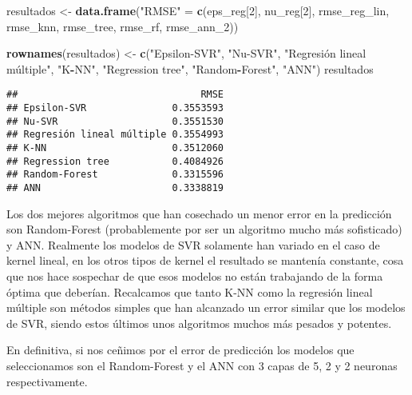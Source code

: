 \documentclass[
]{article}
\newenvironment{Shaded}{\begin{snugshade}}{\end{snugshade}}
\newcommand{\DecValTok}[1]{\textcolor[rgb]{0.00,0.00,0.81}{#1}}
\newcommand{\KeywordTok}[1]{\textcolor[rgb]{0.13,0.29,0.53}{\textbf{#1}}}
\newcommand{\NormalTok}[1]{#1}
\newcommand{\OperatorTok}[1]{\textcolor[rgb]{0.81,0.36,0.00}{\textbf{#1}}}
\newcommand{\StringTok}[1]{\textcolor[rgb]{0.31,0.60,0.02}{#1}}
\begin{document}
\begin{Shaded}
\begin{Highlighting}[]
\NormalTok{resultados <-}\StringTok{ }\KeywordTok{data.frame}\NormalTok{(}\StringTok{"RMSE"}\NormalTok{ =}\StringTok{ }\KeywordTok{c}\NormalTok{(eps_reg[}\DecValTok{2}\NormalTok{], nu_reg[}\DecValTok{2}\NormalTok{], rmse_reg_lin, rmse_knn, rmse_tree, rmse_rf,}
\NormalTok{                                    rmse_ann_}\DecValTok{2}\NormalTok{))}

\KeywordTok{rownames}\NormalTok{(resultados) <-}\StringTok{ }\KeywordTok{c}\NormalTok{(}\StringTok{"Epsilon-SVR"}\NormalTok{, }\StringTok{"Nu-SVR"}\NormalTok{, }\StringTok{"Regresión lineal múltiple", "}\NormalTok{K}\OperatorTok{-}\NormalTok{NN}\StringTok{", "}\NormalTok{Regression tree}\StringTok{",}
\StringTok{                           "}\NormalTok{Random}\OperatorTok{-}\NormalTok{Forest}\StringTok{", "}\NormalTok{ANN}\StringTok{")}
\StringTok{resultados}
\end{Highlighting}
\end{Shaded}

\begin{verbatim}
##                                RMSE
## Epsilon-SVR               0.3553593
## Nu-SVR                    0.3551530
## Regresión lineal múltiple 0.3554993
## K-NN                      0.3512060
## Regression tree           0.4084926
## Random-Forest             0.3315596
## ANN                       0.3338819
\end{verbatim}

Los dos mejores algoritmos que han cosechado un menor error en la
predicción son Random-Forest (probablemente por ser un algoritmo mucho
más sofisticado) y ANN. Realmente los modelos de SVR solamente han
variado en el caso de kernel lineal, en los otros tipos de kernel el
resultado se mantenía constante, cosa que nos hace sospechar de que esos
modelos no están trabajando de la forma óptima que deberían. Recalcamos
que tanto K-NN como la regresión lineal múltiple son métodos simples que
han alcanzado un error similar que los modelos de SVR, siendo estos
últimos unos algoritmos muchos más pesados y potentes.

En definitiva, si nos ceñimos por el error de predicción los modelos que
seleccionamos son el Random-Forest y el ANN con 3 capas de 5, 2 y 2
neuronas respectivamente.
\end{document}
